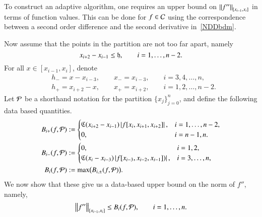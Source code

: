 \documentclass[review]{elsarticle}
\theoremstyle{definition}
\begin{document}
To construct an adaptive algorithm, one requires an upper bound on
$\norm[{[x_{i-1},x_i]}]{f''}$ in terms of function values. This can be done for
$f \in \cc$ using the correspondence between a second order difference and the
second derivative in~\eqref{NDDbdm}.

Now assume that the points in the partition are not too far apart, namely 
\begin{equation} \label{widthrestrict}
x_{i+2} - x_{i-1} \le \fh, \qquad i = 1, \ldots, n-2.
\end{equation} 
For all $ x \in [x_{i-1},x_i]$,  denote
\begin{align*}
&h_- = x - x_{i-3}, \qquad x_- = x_{i-3},  \qquad i=3,4,\ldots,n,\\
 &h_+ = x_{i+2} - x, \qquad x_+ =  x_{i+2}, \qquad i=1,2,\ldots,n-2.
\end{align*}
Let $\cp$ be a shorthand notation for the partition $\{x_j\}_{j=0}^n$, and define the following data based quantities.
\begin{subequations} \label{bpdef}
\begin{align}\label{bpf}
B_{i+}(f,\cp)&:=\begin{cases}
\fC(x_{i+2}-x_{i-1})\abs{f[x_i,x_{i+1},x_{i+2}]},  & i=1,\ldots,n-2,
\\ 0, & i=n-1,n.
\end{cases} \\
\label{bmf}
B_{i-}(f,\cp)&: =\begin{cases}
0,  & i=1,2,
\\ \fC(x_{i}-x_{i-3})\abs{f[x_{i-3},x_{i-2},x_{i-1}])}, & i=3,\ldots,n,
\end{cases} \\
\nonumber
B_i(f,\cp) & : = \max\bigl(B_{i,\pm}(f,\cp) \bigr).
\end{align}
\end{subequations}
We now show that these give us a data-based upper bound on the norm of $f''$, namely,
\begin{equation}\label{normbd}
\norm[{[x_{i-1},x_i]}]{f''} \le B_i(f,\cp), \qquad i =1, \ldots, n.
\end{equation}
\end{document}
